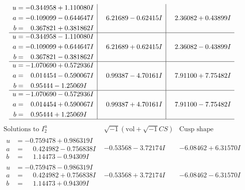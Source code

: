 \documentclass[1p]{elsarticle_modified}
\theoremstyle{definition}
\newcommand{\I}{\sqrt{-1}}
\begin{document}
$$\begin{array}{c|c|c}
\begin{aligned}
u &= -0.344958 + 1.110080 I \\
a &= -0.109099 - 0.644647 I \\
b &= \phantom{-}0.367821 + 0.381862 I\end{aligned}
 & \phantom{-}6.21689 - 0.62415 I & \phantom{-}2.36082 + 0.43899 I \\ \hline\begin{aligned}
u &= -0.344958 - 1.110080 I \\
a &= -0.109099 + 0.644647 I \\
b &= \phantom{-}0.367821 - 0.381862 I\end{aligned}
 & \phantom{-}6.21689 + 0.62415 I & \phantom{-}2.36082 - 0.43899 I \\ \hline\begin{aligned}
u &= -1.070690 + 0.572936 I \\
a &= \phantom{-}0.014454 - 0.590067 I \\
b &= \phantom{-}0.95444 - 1.25069 I\end{aligned}
 & \phantom{-}0.99387 - 4.70161 I & \phantom{-}7.91100 + 7.75482 I \\ \hline\begin{aligned}
u &= -1.070690 - 0.572936 I \\
a &= \phantom{-}0.014454 + 0.590067 I \\
b &= \phantom{-}0.95444 + 1.25069 I\end{aligned}
 & \phantom{-}0.99387 + 4.70161 I & \phantom{-}7.91100 - 7.75482 I\\
 \hline 
 \end{array}$$\newpage$$\begin{array}{c|c|c}  
\text{Solutions to }I^u_{2}& \I (\text{vol} + \sqrt{-1}CS) & \text{Cusp shape}\\
 \hline 
\begin{aligned}
u &= -0.759478 + 0.986319 I \\
a &= \phantom{-}0.424982 - 0.756838 I \\
b &= \phantom{-}1.14473 - 0.94309 I\end{aligned}
 & -0.53568 - 3.72174 I & -6.08462 + 6.31570 I \\ \hline\begin{aligned}
u &= -0.759478 - 0.986319 I \\
a &= \phantom{-}0.424982 + 0.756838 I \\
b &= \phantom{-}1.14473 + 0.94309 I\end{aligned}
 & -0.53568 + 3.72174 I & -6.08462 - 6.31570 I \\ \hline\begin{aligned}

\end{aligned}
\end{array}$$
\end{document}
